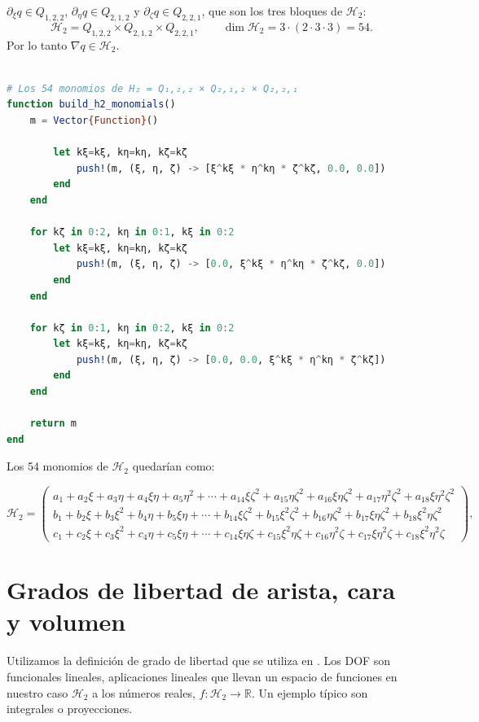 \documentclass[12pt]{report} %
\begin{document}
$\partial_\xi q\in Q_{1,2,2}$, $\partial_\eta q\in Q_{2,1,2}$ y $\partial_\zeta q\in Q_{2,2,1}$, que son los tres bloques de $\mathcal{H}_2$:
\begin{equation}\label{eq:h2}
	\mathcal{H}_2 = Q_{1,2,2} \times Q_{2,1,2} \times Q_{2,2,1},
	\qquad \dim \mathcal{H}_2 = 3 \cdot (2\cdot3\cdot3) = 54 .
\end{equation}
Por lo tanto $\nabla q\in\mathcal{H}_2$.

\begin{lstlisting}[language=Julia, caption={Construcci\'on de los 54 monomios de $\mathcal{H}_2$.}, label=cod:h2-monomios]
	
# Los 54 monomios de H₂ = Q₁,₂,₂ × Q₂,₁,₂ × Q₂,₂,₁
function build_h2_monomials()
    m = Vector{Function}()

        let kξ=kξ, kη=kη, kζ=kζ
            push!(m, (ξ, η, ζ) -> [ξ^kξ * η^kη * ζ^kζ, 0.0, 0.0])
        end
    end

    for kζ in 0:2, kη in 0:1, kξ in 0:2
        let kξ=kξ, kη=kη, kζ=kζ
            push!(m, (ξ, η, ζ) -> [0.0, ξ^kξ * η^kη * ζ^kζ, 0.0])
        end
    end

    for kζ in 0:1, kη in 0:2, kξ in 0:2
        let kξ=kξ, kη=kη, kζ=kζ
            push!(m, (ξ, η, ζ) -> [0.0, 0.0, ξ^kξ * η^kη * ζ^kζ])
        end
    end

    return m
end
\end{lstlisting}

Los 54 monomios de $\mathcal{H}_2$  quedarían como:

\begin{equation}\label{eq:h2-monomios}
	\mathcal{H}_2 =
	\begin{pmatrix}
		a_1 + a_2 \xi + a_3 \eta + a_4 \xi\eta + a_5 \eta^2 + \cdots + a_{14} \xi\zeta^2 + a_{15} \eta\zeta^2 + a_{16} \xi\eta\zeta^2 + a_{17} \eta^2\zeta^2 + a_{18} \xi\eta^2\zeta^2\\
		b_1 + b_2 \xi + b_3 \xi^2 + b_4 \eta + b_5 \xi\eta + \cdots + b_{14} \xi\zeta^2 + b_{15} \xi^2\zeta^2 + b_{16} \eta\zeta^2 + b_{17} \xi\eta\zeta^2 + b_{18} \xi^2\eta\zeta^2\\
		c_1 + c_2 \xi + c_3 \xi^2 + c_4 \eta + c_5 \xi\eta + \cdots + c_{14} \xi\eta\zeta + c_{15} \xi^2\eta\zeta + c_{16} \eta^2\zeta + c_{17} \xi\eta^2\zeta + c_{18} \xi^2\eta^2\zeta
	\end{pmatrix},
\end{equation}

\section{Grados de libertad de arista, cara y volumen}\label{sec:dofs}
Utilizamos la definición de grado de libertad que se utiliza en \cite{nedelec1980, ciarlet2002, amor2023hexahedral}. Los DOF son funcionales lineales, aplicaciones lineales que llevan un espacio de funciones en nuestro caso $\mathcal{H}_2$ a los números reales, $f:\mathcal{H}_2\longrightarrow\mathbb{R}$. Un ejemplo típico son integrales o proyecciones.
\end{document}
